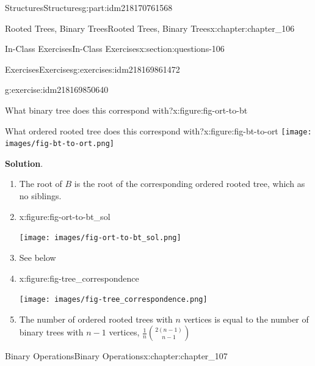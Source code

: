 \documentclass[oneside,10pt,]{book}
\newcommand{\blocktitlefont}{\relax}
\numberwithin{equation}{section}
\begin{document}
\begin{partptx}{Structures}{}{Structures}{}{}{g:part:idm218170761568}
\begin{chapterptx}{Rooted Trees, Binary Trees}{}{Rooted Trees, Binary Trees}{}{}{x:chapter:chapter_106}
\begin{sectionptx}{In-Class Exercises}{}{In-Class Exercises}{}{}{x:section:questions-106}
\begin{exercises-subsection-numberless}{Exercises}{}{Exercises}{}{}{g:exercises:idm218169861472}
\begin{exercisegroup}
\begin{divisionexerciseeg}{5}{}{}{g:exercise:idm218169850640}
\begin{sidebyside}{2}{0}{0}{0}
\begin{sbspanel}{0.5}
\begin{figureptx}{What binary tree does this correspond with?}{x:figure:fig-ort-to-bt}{}
\tcblower
\end{figureptx}%
\end{sbspanel}%
\begin{sbspanel}{0.5}%
\begin{figureptx}{What ordered rooted tree does this correspond with?}{x:figure:fig-bt-to-ort}{}%
\texttt{[image: images/fig-bt-to-ort.png]}
\tcblower
\end{figureptx}%
\end{sbspanel}%
\end{sidebyside}%
\par\smallskip%
\noindent\textbf{\blocktitlefont Solution}.\hypertarget{g:solution:idm218169829808}{}\quad{}%
\begin{enumerate}[label=(\alph*)]
\item{}The root of \(B\) is the root of the corresponding ordered rooted tree, which as no siblings.%
\item{}\begin{figureptx}{}{x:figure:fig-ort-to-bt_sol}{}%
\begin{image}{0.3}{0.4}{0.3}%
\texttt{[image: images/fig-ort-to-bt\_sol.png]}
\end{image}%
\tcblower
\end{figureptx}%
%
\item{}See below%
\item{}\begin{figureptx}{}{x:figure:fig-tree_correspondence}{}%
\begin{image}{0.15}{0.7}{0.15}%
\texttt{[image: images/fig-tree\_correspondence.png]}
\end{image}%
\tcblower
\end{figureptx}%
%
\item{}The number of ordered rooted trees with \(n\) vertices is equal to the number of binary trees with \(n-1\) vertices, \(\frac{1}{n} \binom{2(n-1)}{n-1}\)%
\end{enumerate}
%
\end{divisionexerciseeg}%
\end{exercisegroup}
\par\medskip\noindent
\end{exercises-subsection-numberless}
\end{sectionptx}
\end{chapterptx}
%
\typeout{************************************************}
\typeout{************************************************}
%
\begin{chapterptx}{Binary Operations}{}{Binary Operations}{}{}{x:chapter:chapter_107}

\end{chapterptx}
\end{partptx}
\end{document}

